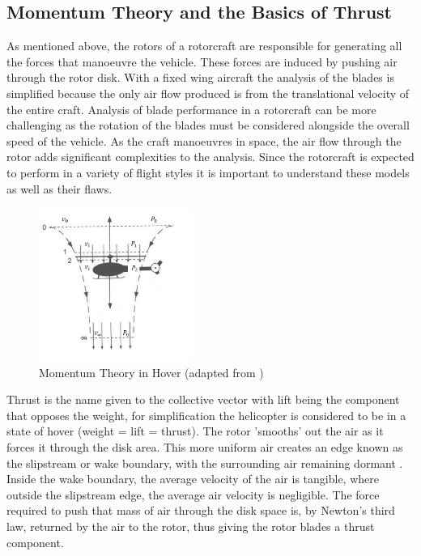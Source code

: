 \documentclass[a4paper, 10pt, conference]{ieeeconf}
\begin{document}
\subsection{Momentum Theory and the Basics of Thrust}
As mentioned above, the rotors of a rotorcraft are responsible for generating all the forces that manoeuvre the vehicle. These forces are induced by pushing air through the rotor disk. With a fixed wing aircraft the analysis of the blades is simplified because the only air flow produced is from the translational velocity of the entire craft. Analysis of blade performance in a rotorcraft can be more challenging as the rotation of the blades must be considered alongside the overall speed of the vehicle. As the craft manoeuvres in space, the air flow through the rotor adds significant complexities to the analysis. Since the rotorcraft is expected to perform in a variety of flight styles it is important to understand these models as well as their flaws. 

\begin{figure}[t]
\centering
\includegraphics[height = 5cm, angle=360]{Images/Literature/MomentumTheoryHover}			%
\caption{Momentum Theory in Hover (adapted from \cite{Leishman})}
\label{IM_MomentumTheoryHover}
\end{figure}

Thrust is the name given to the collective vector with lift being the component that opposes the weight, for simplification the helicopter is considered to be in a state of hover (weight = lift = thrust). The rotor 'smooths' out the air as it forces it through the disk area. This more uniform air creates an edge known as the slipstream or wake boundary, with the surrounding air remaining dormant \cite{Leishman}. Inside the wake boundary, the average velocity of the air is tangible, where outside the slipstream edge, the average air velocity is negligible. The force required to push that mass of air through the disk space is, by Newton's third law, returned by the air to the rotor, thus giving the rotor blades a thrust component. 
\end{document}
